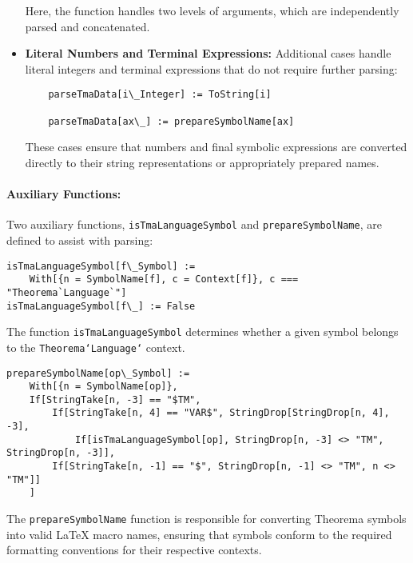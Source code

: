 \begin{itemize}
    Here, the function handles two levels of arguments, which are independently parsed and concatenated.

    \item \textbf{Literal Numbers and Terminal Expressions:} Additional cases handle literal integers and terminal expressions that do not require further parsing:

    \begin{verbatim}
    parseTmaData[i\_Integer] := ToString[i]

    parseTmaData[ax\_] := prepareSymbolName[ax]
    \end{verbatim}

    These cases ensure that numbers and final symbolic expressions are converted directly to their string representations or appropriately prepared names.

\end{itemize}

\paragraph{Auxiliary Functions:}

Two auxiliary functions, \texttt{isTmaLanguageSymbol} and \texttt{prepareSymbolName}, are defined to assist with parsing:

\begin{verbatim}
isTmaLanguageSymbol[f\_Symbol] := 
    With[{n = SymbolName[f], c = Context[f]}, c === "Theorema`Language`"]
isTmaLanguageSymbol[f\_] := False
\end{verbatim}

The function \texttt{isTmaLanguageSymbol} determines whether a given symbol belongs to the \texttt{Theorema`Language`} context. 

\begin{verbatim}
prepareSymbolName[op\_Symbol] := 
    With[{n = SymbolName[op]}, 
    If[StringTake[n, -3] == "$TM", 
        If[StringTake[n, 4] == "VAR$", StringDrop[StringDrop[n, 4], -3], 
            If[isTmaLanguageSymbol[op], StringDrop[n, -3] <> "TM", StringDrop[n, -3]], 
        If[StringTake[n, -1] == "$", StringDrop[n, -1] <> "TM", n <> "TM"]]
    ]
\end{verbatim}

The \texttt{prepareSymbolName} function is responsible for converting Theorema symbols into valid LaTeX macro names, ensuring that symbols conform to the required formatting conventions for their respective contexts.

